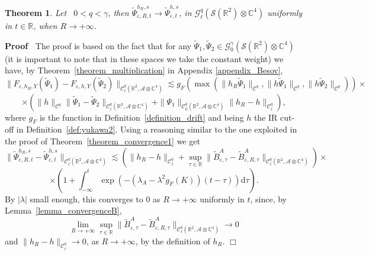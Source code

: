 \documentclass{article}
\newcommand{\mathd}{\mathrm{d}}
\newenvironment{proof}{\noindent\textbf{Proof\ }}{\hspace*{\fill}$\Box$\medskip}
\newtheorem{theorem}{Theorem}
\begin{document}
\begin{theorem}
  \label{theorem_torusplane}Let \ $0 < q < \gamma$, then
  $\tilde{\Psi}_{\varepsilon, R, t}^{h_R, s} \rightarrow
  \tilde{\Psi}_{\varepsilon, t}^{h, s}$, in $\mathcal{G}^q_{\ell} (\mathcal{S}
  (\mathbb{R}^2) \otimes \mathbb{C}^4)$ uniformly in $t \in \mathbb{R}$, when
  $R \rightarrow + \infty$.
\end{theorem}

\begin{proof}
  The proof is based on the fact that for any $\tilde{\Psi}_1, \tilde{\Psi}_2
  \in \mathcal{} \mathcal{G}^{\gamma}_0 (\mathcal{S} (\mathbb{R}^2) \otimes
  \mathbb{C}^4)$ (it is important to note that in these spaces we take the
  constant weight) we have, by Theorem~\ref{theorem_multiplication} in
  Appendix \ref{appendix_Besov},
  \[ \| F_{\varepsilon, h_R, Y} (\tilde{\Psi}_1) - F_{\varepsilon, h, Y}
     (\tilde{\Psi}_2) \|_{\mathcal{C}^q_{\ell} (\mathbb{R}^2, \mathcal{A}
     \otimes \mathbb{C}^4)} \lesssim g_F (\max (\| h_R \tilde{\Psi}_1
     \|_{\mathcal{C}^q}, \| h \tilde{\Psi}_1 \|_{\mathcal{C}^q}, \| h
     \tilde{\Psi}_2 \|_{\mathcal{C}^q})) \times \]
  \begin{equation}
    \times (\| h \|_{\mathcal{C}^q} \| \tilde{\Psi}_1 - \tilde{\Psi}_2
    \|_{\mathcal{C}^q_{\ell} (\mathbb{R}^2, \mathcal{A} \otimes \mathbb{C}^4)}
    + \| \Psi_1 \|_{\mathcal{C}^q_0 (\mathbb{R}^2, \mathcal{A} \otimes
    \mathbb{C}^4)} \| h_R - h \|_{\mathcal{C}^q_{\ell}})
    \label{eq:inequalityh},
  \end{equation}
  where $g_F$ is the function in Definition~\ref{definition_drift} and being
  $h$ the IR cut-off in Definition~\ref{def:yukawa2}. Using a reasoning
  similar to the one exploited in the proof of
  Theorem~\ref{theorem_convergence1} we get
  \[ \| \tilde{\Psi}_{\varepsilon, R, t}^{h_R, s} -
     \tilde{\Psi}_{\varepsilon, t}^{h, s} \|_{\mathcal{C}^q_{\ell}
     (\mathbb{R}^2, \mathcal{A} \otimes \mathbb{C}^4)} \lesssim (\| h_R - h
     \|_{\mathcal{C}^q_{\ell}} + \sup_{\tau \in \mathbb{R}} \|
     \tilde{B}_{\varepsilon, \tau}^A - \tilde{B}^A_{\varepsilon, R, \tau}
     \|_{\mathcal{C}^q_{\ell} (\mathbb{R}^2, \mathcal{A} \otimes
     \mathbb{C}^4)}) \times \]
  \[ \times \left( 1 + \int_{- \infty}^t \exp (- (\lambda_A - \lambda^2 g_F
     (K)) (t - \tau)) \mathd \tau \right) . \]
  By $| \lambda |$ small enough, this converges to $0$ as $R \rightarrow +
  \infty$ uniformly in $t$, since, by Lemma~\ref{lemma_convergenceB},
  \[ \lim_{R \rightarrow + \infty} \sup_{\tau \in \mathbb{R}} \|
     \tilde{B}_{\varepsilon, \tau}^A - \tilde{B}^A_{\varepsilon, R, \tau}
     \|_{\mathcal{C}^q_{\ell} (\mathbb{R}^2, \mathcal{A} \otimes
     \mathbb{C}^4)} \rightarrow 0 \]
  and $\| h_R - h \|_{\mathcal{C}^q_{\ell}} \rightarrow 0$, as $R \rightarrow
  + \infty$, by the definition of $h_R$.
\end{proof}
\end{document}
